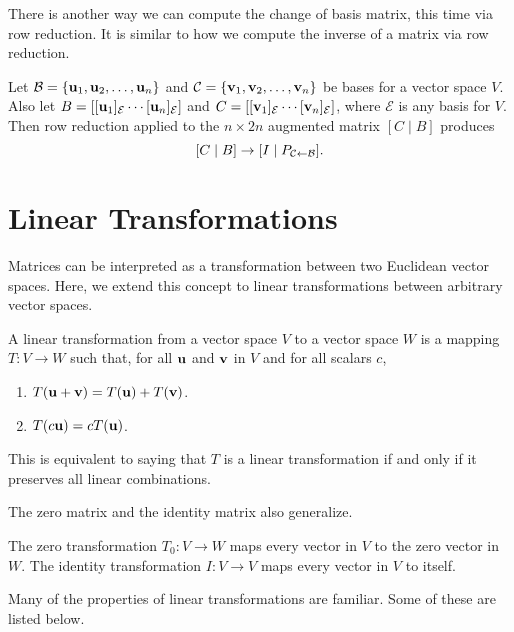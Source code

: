 \documentclass[../m73main.tex]{subfiles}
\begin{document}
There is another way we can compute the change of basis matrix, this time via row reduction.
It is similar to how we compute the inverse of a matrix via row reduction.

\begin{theorem}
	Let $\mathcal{B} = \{\mathbf{u}_1, \mathbf{u}_2, \ldots, \mathbf{u}_n\}$ and $\mathcal{C} = \{\mathbf{v}_1, \mathbf{v}_2, \ldots, \mathbf{v}_n\}$ be bases for a vector space $V$.
	Also let $B = [[\mathbf{u}_1]_{\mathcal{E}} \cdots [\mathbf{u}_n]_{\mathcal{E}}]$ and $C = [[\mathbf{v}_1]_{\mathcal{E}} \cdots [\mathbf{v}_n]_{\mathcal{E}}]$, where $\mathcal{E}$ is any basis for $V$.
	Then row reduction applied to the $n \times 2n$ augmented matrix $[C \;|\; B]$ produces
	\[ [C \;|\; B] \to [I \;|\; P_{\mathcal{C} \leftarrow \mathcal{B}}]. \]
\end{theorem}

\section{Linear Transformations}
Matrices can be interpreted as a transformation between two Euclidean vector spaces.
Here, we extend this concept to linear transformations between arbitrary vector spaces.

\begin{definition}
	A linear transformation from a vector space $V$ to a vector space $W$ is a mapping $T : V \to W$ such that, for all $\mathbf{u}$ and $\mathbf{v}$ in $V$ and for all scalars $c$,
	\begin{enumerate}
		\item $T(\mathbf{u} + \mathbf{v}) = T(\mathbf{u}) + T(\mathbf{v})$.
		\item $T(c \mathbf{u}) = cT(\mathbf{u})$.
	\end{enumerate}
	This is equivalent to saying that $T$ is a linear transformation if and only if it preserves all linear combinations.
\end{definition}

The zero matrix and the identity matrix also generalize.

\begin{definition}
	The zero transformation $T_0 : V \to W$ maps every vector in $V$ to the zero vector in $W$.
	The identity transformation $I : V \to V$ maps every vector in $V$ to itself.
\end{definition}

Many of the properties of linear transformations are familiar.
Some of these are listed below.
\end{document}
